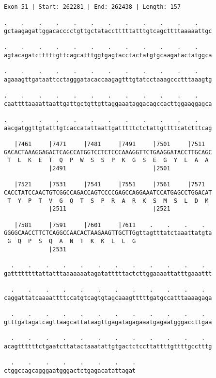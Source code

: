 \documentclass{article}
\begin{document}
\begin{Verbatim}[fontfamily=courier]
Exon 51 | Start: 262281 | End: 262438 | Length: 157

.    .    .    .    .    .    .    .    .    .    .    .    
gctaagagattggacacccctgttgctatacctttttatttgtcagcttttaaaaattgc

.    .    .    .    .    .    .    .    .    .    .    .    
agtacagatctttttgttcagcatttggtgagtacctactatgtgcaagatactatggca

.    .    .    .    .    .    .    .    .    .    .    .    
agaaagttgataattcctagggatacaccaagagtttgtatcctaaagccctttaaagtg

.    .    .    .    .    .    .    .    .    .    .    .    
caattttaaaattaattgattgctgttgttaggaaataggacagccacttggaaggagca

.    .    .    .    .    .    .    .    .    .    .    .    
aacgatggttgtatttgtcaccatattaattgatttttctctattgttttcatctttcag

   |7461     |7471     |7481     |7491     |7501     |7511  
GACACTAAAGGAGACTCAGCCATGGTCCTCTCCCAAAGGTTCTGAAGGATACCTTGCAGC
 T  L  K  E  T  Q  P  W  S  S  P  K  G  S  E  G  Y  L  A  A 
             |2491                         |2501            

   |7521     |7531     |7541     |7551     |7561     |7571  
CACCTATCCAACTGTCGGCCAGACCAGTCCCCGAGCCAGGAAATCCATGAGCCTGGACAT
 T  Y  P  T  V  G  Q  T  S  P  R  A  R  K  S  M  S  L  D  M 
             |2511                         |2521            

   |7581     |7591     |7601     |7611    .    .    .    .  
GGGGCAACCTTCTCAGGCCAACACTAAGAAGTTGCTTGgttagtttatctaaattatgta
 G  Q  P  S  Q  A  N  T  K  K  L  L  G                      
             |2531                                          

  .    .    .    .    .    .    .    .    .    .    .    .  
gattttttttattatttaaaaaaatagatatttttactcttggaaaattatttgaaattt

  .    .    .    .    .    .    .    .    .    .    .    .  
caggattatcaaaattttccatgtcagtgtagcaaagtttttgatgccatttaaaagaga

  .    .    .    .    .    .    .    .    .    .    .    .  
gtttgatagatcagttaagcattataagttgagatagagaaatgagaatgggaccttgaa

  .    .    .    .    .    .    .    .    .    .    .    .  
acagttttttctgaatcttatactaaatattgtgactctccttattttgttttgcctttg

  .    .    .    .    .    .    .    .
ctggccagcagggaatgggactctgagacatattagat
\end{Verbatim}
\end{document}
